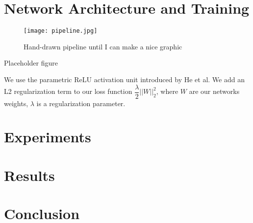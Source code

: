 \documentclass[pageno]{jpaper}
\begin{document}
\section{Network Architecture and Training}

\begin{figure}[!tbp]
  \centering
  \texttt{[image: pipeline.jpg]}
  \caption{Hand-drawn pipeline until I can make a nice graphic}
  \label{fig:pipeline}
\end{figure}
Placeholder figure

We use the parametric ReLU activation unit introduced by He et al.\cite{he2016deep} We add an L2 regularization term to our loss function $\dfrac{\lambda}{2}||W||_2^2$, where $W$ are our networks weights, $\lambda$ is a regularization parameter. 


\section{Experiments}

\section{Results}

\section{Conclusion}

% 
\pagebreak


\end{document}
